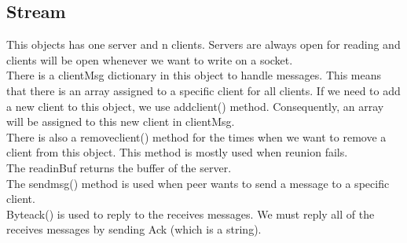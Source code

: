 \documentclass{article}
\begin{document}
\subsection{Stream}This objects has one server and n clients. Servers are always open for reading and clients will be open whenever we want to write on a socket. \\
There is a clientMsg dictionary in this object to handle messages. This means that there is an array assigned to a specific client for all clients. If we need to add a new client to this object, we use add\underline{\hspace{.05in}}client() method. Consequently, an array will be assigned to this new client in clientMsg.\\
There is also a remove\underline{\hspace{.05in}}client() method for the times when we want to remove a client from this object. This method is mostly used  when reunion fails.\\
The read\underline{\hspace{.05in}}inBuf returns the buffer of the server.\\
The send\underline{\hspace{.05in}}msg() method is used when peer wants to send a message to a specific client.\\
Byte\underline{\hspace{.05in}}ack() is used to reply to the receives messages. We must reply all of the receives messages by sending Ack (which is a string).\\
\end{document}
